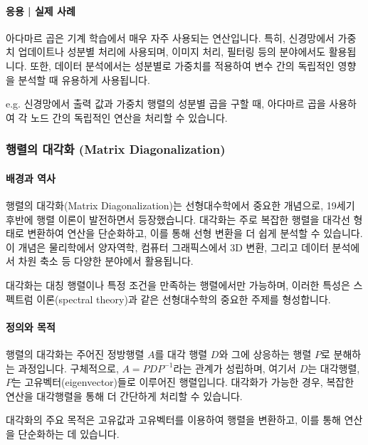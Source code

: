 \paragraph{응용 | 실제 사례}
아다마르 곱은 기계 학습에서 매우 자주 사용되는 연산입니다. 특히, 신경망에서 가중치 업데이트나 성분별 처리에 사용되며, 이미지 처리, 필터링 등의 분야에서도 활용됩니다. 또한, 데이터 분석에서는 성분별로 가중치를 적용하여 변수 간의 독립적인 영향을 분석할 때 유용하게 사용됩니다.

\vspace{1\baselineskip}
\noindent {} e.g. 신경망에서 출력 값과 가중치 행렬의 성분별 곱을 구할 때, 아다마르 곱을 사용하여 각 노드 간의 독립적인 연산을 처리할 수 있습니다.





\subsubsection{행렬의 대각화 (Matrix Diagonalization)}

\paragraph{배경과 역사}
행렬의 대각화(Matrix Diagonalization)는 선형대수학에서 중요한 개념으로, 19세기 후반에 행렬 이론이 발전하면서 등장했습니다. 대각화는 주로 복잡한 행렬을 대각선 형태로 변환하여 연산을 단순화하고, 이를 통해 선형 변환을 더 쉽게 분석할 수 있습니다. 이 개념은 물리학에서 양자역학, 컴퓨터 그래픽스에서 3D 변환, 그리고 데이터 분석에서 차원 축소 등 다양한 분야에서 활용됩니다.

\noindent 대각화는 대칭 행렬이나 특정 조건을 만족하는 행렬에서만 가능하며, 이러한 특성은 스펙트럼 이론(spectral theory)과 같은 선형대수학의 중요한 주제를 형성합니다.

\paragraph{정의와 목적}
행렬의 대각화는 주어진 정방행렬 \( A \)를 대각 행렬 \( D \)와 그에 상응하는 행렬 \( P \)로 분해하는 과정입니다. 구체적으로, \( A = P D P^{-1} \)라는 관계가 성립하며, 여기서 \( D \)는 대각행렬, \( P \)는 고유벡터(eigenvector)들로 이루어진 행렬입니다. 대각화가 가능한 경우, 복잡한 연산을 대각행렬을 통해 더 간단하게 처리할 수 있습니다.

\noindent 대각화의 주요 목적은 고유값과 고유벡터를 이용하여 행렬을 변환하고, 이를 통해 연산을 단순화하는 데 있습니다.

